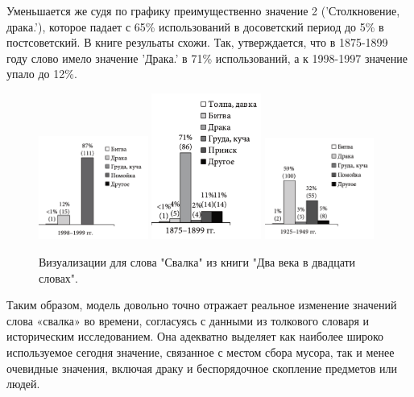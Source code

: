 \documentclass[LI,VKR]{HSEUniversity}
\begin{document}
Уменьшается же судя по графику преимущественно значение 2 (’Столкновение, драка.’),
которое падает с 65\% использований в досоветский период до 5\% в постсоветский.
В книге резульаты схожи.
Так, утверждается, что в 1875-1899 году слово имело значение ’Драка.’
в 71\% использований,
а к 1998-1997 значение упало до 12\%.

\noindent %
\begin{figure}[H]
    \centering %
    \includegraphics[width=0.32\textwidth]{img/Book/Свалка 1998-1999}
    \hfill %
    \includegraphics[width=0.32\textwidth]{img/Book/Свалка 1875-1799}
    \hfill %
    \includegraphics[width=0.32\textwidth]{img/Book/Свалка 1925-1949}
    \caption{Визуализации для слова "Свалка" из книги "Два века в двадцати словах".}
\end{figure}

Таким образом, модель довольно точно отражает реальное изменение значений слова «свалка»
во времени, согласуясь с данными из толкового словаря и историческим исследованием.
Она адекватно выделяет как наиболее широко используемое сегодня значение,
связанное с местом сбора мусора,
так и менее очевидные значения, включая драку и беспорядочное скопление предметов или людей.
\end{document}
